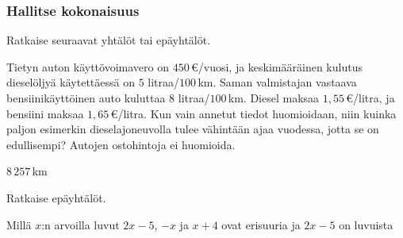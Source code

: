 \begin{tehtavasivu}
\begin{tehtava}
\begin{vastaus}
	\end{vastaus}
\end{tehtava}

\subsubsection*{Hallitse kokonaisuus}

\begin{tehtava}
    Ratkaise seuraavat yhtälöt tai epäyhtälöt.
    \begin{vastaus}
    \end{vastaus}
\end{tehtava}

\begin{tehtava}
	Tietyn auton käyttövoimavero on $450$\,€/vuosi, ja keskimääräinen kulutus dieselöljyä käytettäessä on $5$ litraa/$100$\,km. Saman valmistajan vastaava bensiinikäyttöinen auto kuluttaa $8$ litraa/$100$\,km. Diesel maksaa $1,55$\,€/litra, ja bensiini maksaa $1,65$\,€/litra. Kun vain annetut tiedot huomioidaan, niin kuinka paljon esimerkin dieselajoneuvolla tulee vähintään ajaa vuodessa, jotta se on edullisempi? Autojen ostohintoja ei huomioida.
    \begin{vastaus}
        $8\,257$\,km
    \end{vastaus}
\end{tehtava}

\begin{tehtava}
    Ratkaise epäyhtälöt.
    \begin{vastaus}
    \end{vastaus}
\end{tehtava}

\begin{tehtava}
	Millä $x$:n arvoilla luvut $2x - 5$, $-x$ ja $x + 4$ ovat erisuuria ja $2x - 5$ on luvuista
	\begin{vastaus}
	\end{vastaus}
\end{tehtava}


\end{tehtavasivu}
